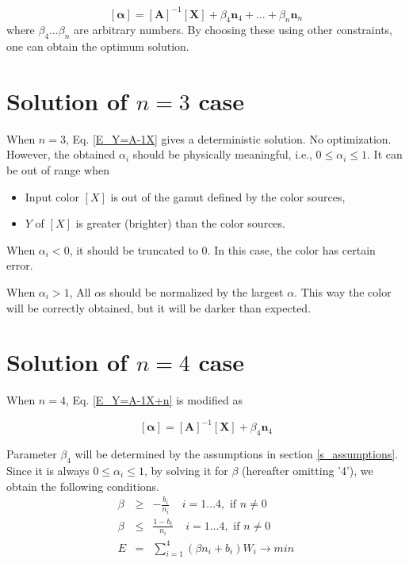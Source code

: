 \documentclass[dvipdfmx,uplatex]{article}
\begin{document}
\begin{equation}
  \label{E_Y=A-1X+n}
  \left[ \boldsymbol{\alpha} \right] =
  \left[ \boldsymbol{A} \right]^{-1}
  \left[ \boldsymbol{X} \right]
  + \beta_4 \boldsymbol{n}_4 + \ldots + \beta_n \boldsymbol{n}_n
\end{equation}
\noindent
where $ \beta_4 \ldots \beta_n $ are arbitrary numbers. By choosing these using other constraints, one can obtain the optimum solution.




\section{Solution of $n=3$ case}

When $n=3$, Eq. \ref{E_Y=A-1X} gives a deterministic solution. No optimization. However, the obtained $ \alpha_i $ should be physically meaningful, i.e., $ 0 \leq \alpha_i \leq 1 $. It can be out of range when
\begin{itemize}
  \item Input color $[X]$ is out of the gamut defined by the color sources,
  \item $Y$ of $[X]$ is greater (brighter) than the color sources.
\end{itemize}
\noindent
When $ \alpha_i < 0$, it should be truncated to 0. In this case, the color has certain error.

When $ \alpha_i > 1 $, All $\alpha$s should be normalized by the largest $\alpha$. This way the color will be correctly obtained, but it will be darker than expected.




\section{Solution of $n=4$ case}

When $n=4$, Eq. \ref{E_Y=A-1X+n} is modified as

\begin{equation}
  \label{E_Y=A-1X+1}
  \left[ \boldsymbol{\alpha} \right] =
  \left[ \boldsymbol{A} \right]^{-1}
  \left[ \boldsymbol{X} \right]
  + \beta_4 \boldsymbol{n}_4
\end{equation}

\noindent
Parameter $\beta_4$ will be determined by the assumptions in section \ref{s_assumptions}.
Since it is always $ 0 \leq \alpha_i \leq 1$, by solving it for $\beta$ (hereafter omitting '4'), we obtain the following conditions.
\begin{eqnarray}
  \beta &\geq& - \frac{b_i}{n_i} \;\;\;\; i = 1 \ldots 4, \text{ if \(n \neq 0\)} \label{E_betamin} \\
  \beta &\leq& \frac{1 - b_i}{n_i} \;\;\;\; i = 1 \ldots 4, \text{ if \(n \neq 0\)} \label{E_betamax} \\
  E &=& \sum_{i=1}^4 (\beta n_i + b_i) W_i \to min \label{E_energy_n4}
\end{eqnarray}
\end{document}
